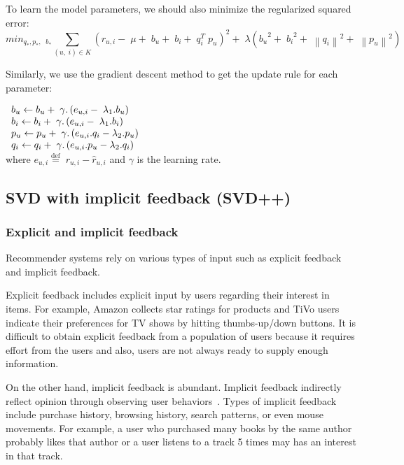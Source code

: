 \documentclass[oneside,13pt]{extreport}
\begin{document}
To learn the model parameters, we should also minimize the regularized squared error:
\begin{equation}
mi{n_{{q_*},{p_*},\;\;{b_*}}}\mathop \sum \limits_{\left( {u,\;i} \right) \in K} {\left( {{r_{u,i}} - \;\mu  + \;{b_u} + \;{b_i} + \;q_i^T\;{p_u}} \right)^2} + \;\lambda \left( {{b_u}^2 + \;{b_i}^2 + \;{{\left\| {{q_i}} \right\|}^2} + \;{{\left\| {{p_u}} \right\|}^2}} \right)
\end{equation}

Similarly, we use the gradient descent method to get the update rule for each parameter:

$
\begin{array}{l}{b_u} \leftarrow {b_u} + {\rm{\;}}\gamma .\left( {{e_{u,i}} - {\rm{\;}}{\lambda _1}.{b_u}} \right)\\{b_i} \leftarrow {b_i} + {\rm{\;}}\gamma .\left( {{e_{u,i}} - {\rm{\;}}{\lambda _1}.{b_i}} \right)\\{p_u} \leftarrow {p_u} + {\rm{\;}}\gamma .\left( {{e_{u,i}}.{q_i} - {\lambda _2}.{p_u}} \right)\\{q_i} \leftarrow {q_i} + {\rm{\;}}\gamma .\left( {{e_{u,i}}.{p_u} - {\lambda _2}.{q_i}} \right)\end{array}
$
\\
where ${e_{u,i}} \stackrel{\text{def}}{=} \;{r_{u,i}} - \hat r_{u,i}$ and $\gamma$ is the learning rate.

\subsection{SVD with implicit feedback (SVD++)}
\subsubsection{Explicit and implicit feedback}
Recommender systems rely on various types of input such as explicit feedback and implicit feedback. 

Explicit feedback includes explicit input by users regarding their interest in items. For example, Amazon collects star ratings for products and TiVo users indicate their
preferences for TV shows by hitting thumbs-up/down buttons. It is difficult to obtain explicit  feedback from a population of users because it requires effort from the users and also, users are not always ready to supply enough information. 

 On the other hand, implicit feedback is abundant. Implicit feedback indirectly reflect opinion through observing user behaviors~\cite{oard1998implicit}. Types of implicit feedback include purchase history, browsing history, search patterns, or even mouse movements. For
example, a user who purchased many books by the same author probably likes that
author or  a user listens to a track 5 times may has an interest in that track.
\end{document}

